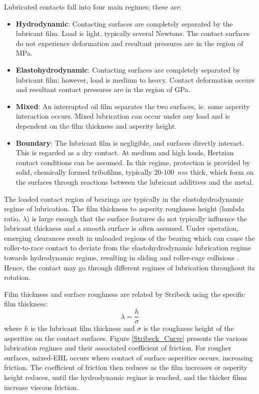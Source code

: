 Lubricated contacts fall into four main regimes; these are:

\begin{itemize}
	\item \textbf{Hydrodynamic}: Contacting surfaces are completely separated by the lubricant film. Load is light, typically several Newtons. The contact surfaces do not experience deformation and resultant pressures are in the region of MPa.
	\item \textbf{Elastohydrodynamic}: Contacting surfaces are completely separated by lubricant film; however, load is medium to heavy. Contact deformation occurs and resultant contact pressures are in the region of GPa.
	\item \textbf{Mixed}: An interrupted oil film separates the two surfaces, ie. some asperity interaction occurs. Mixed lubrication can occur under any load and is dependent on the film thickness and asperity height.
	\item \textbf{Boundary}: The lubricant film is negligible, and surfaces directly interact. This is regarded as a dry contact. At medium and high loads, Hertzian contact conditions can be assumed. In this regime, protection is provided by solid, chemically formed tribofilms, typically 20-100~$nm$ thick, which form on the surfaces through reactions between the lubricant additives and the metal.
\end{itemize}

The loaded contact region of bearings are typically in the elastohydrodynamic regime of lubrication. The film thickness to asperity roughness height (lambda ratio, $\lambda$) is large enough that the surface features do not typically influence the lubricant thickness and a smooth surface is often assumed. Under operation, emerging clearances result in unloaded regions of the bearing which can cause the roller-to-race contact to deviate from the elastohydrodynamic lubrication regime towards hydrodynamic regime, resulting in sliding and roller-cage collisions \cite{Mohammadpour2015c}. Hence, the contact may go through different regimes of lubrication throughout its rotation.

Film thickness and surface roughness are related by Stribeck \cite{Stribeck1907} using the specific film thickness:
\begin{equation}\label{eq2.5}
	\lambda=\frac{h}{\sigma}
\end{equation}
where $h$ is the lubricant film thickness and $\sigma$ is the roughness height of the asperities on the contact surfaces. Figure \ref{Stribeck_Curve} presents the various lubrication regimes and their associated coefficient of friction. For rougher surfaces, mixed-EHL occurs where contact of surface asperities occurs, increasing friction. The coefficient of friction then reduces as the film increases or asperity height reduces, until the hydrodynamic regime is reached, and the thicker films increase viscous friction.

